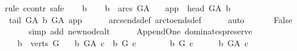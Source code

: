 \begin{isabellebody}
%
\isadelimproof
%
\endisadelimproof
%
\isatagproof
{}\isamarkupfalse%
{\isacharparenleft}{\kern0pt}rule\ ccontr{\isacharcomma}{\kern0pt}\ safe{\isacharparenright}{\kern0pt}\isanewline
\ \ \isamarkupfalse%
\ b\isanewline
\ \ \isamarkupfalse%
\ {\isachardoublequoteopen}b\ {\isasymin}\ arcs\ G{\isacharunderscore}{\kern0pt}A{\isachardoublequoteclose}\isanewline
\ \ \ {\isachardoublequoteopen}app\ {\isacharequal}{\kern0pt}\ head\ G{\isacharunderscore}{\kern0pt}A\ b{\isachardoublequoteclose}\isanewline
\ \ \isamarkupfalse%
\ \isamarkupfalse%
\ {\isachardoublequoteopen}tail\ G{\isacharunderscore}{\kern0pt}A\ b\ {\isasymrightarrow}\isactrlbsub G{\isacharunderscore}{\kern0pt}A\isactrlesub \ app{\isachardoublequoteclose}\isanewline
\ \ \ \ \isamarkupfalse%
\ arcs{\isacharunderscore}{\kern0pt}ends{\isacharunderscore}{\kern0pt}def\ arc{\isacharunderscore}{\kern0pt}to{\isacharunderscore}{\kern0pt}ends{\isacharunderscore}{\kern0pt}def\isanewline
\ \ \ \ \isamarkupfalse%
\ auto\ \isanewline
\ \ \isamarkupfalse%
\ \isamarkupfalse%
\ False\ \isanewline
\ \ \ \ \isamarkupfalse%
\ {\isacharparenleft}{\kern0pt}simp\ add{\isacharcolon}{\kern0pt}\ new{\isacharunderscore}{\kern0pt}node{\isacharunderscore}{\kern0pt}alt{\isacharparenright}{\kern0pt}\ \isanewline
{}\isamarkupfalse%
%
\endisatagproof
{\isafoldproof}%
%
\isadelimproof
\isanewline
%
\endisadelimproof
\ \ \isanewline
{}\isamarkupfalse%
\ {\isacharparenleft}{\kern0pt}\ Append{\isacharunderscore}{\kern0pt}One{\isacharparenright}{\kern0pt}\ dominates{\isacharunderscore}{\kern0pt}preserve{\isacharcolon}{\kern0pt}\isanewline
\ \ \ {\isachardoublequoteopen}b\ {\isasymin}\ verts\ G{\isachardoublequoteclose}\isanewline
\ \ \ {\isachardoublequoteopen}b\ {\isasymrightarrow}\isactrlbsub G{\isacharunderscore}{\kern0pt}A\isactrlesub \ c\ {\isasymlongleftrightarrow}\ b\ {\isasymrightarrow}\isactrlbsub G\isactrlesub \ c{\isachardoublequoteclose}\isanewline
%
\isadelimproof
%
\endisadelimproof
%
\isatagproof
{}\isamarkupfalse%
\ \ \isanewline
\ \ \isamarkupfalse%
\ {\isachardoublequoteopen}\ b\ {\isasymrightarrow}\isactrlbsub G\isactrlesub \ c{\isachardoublequoteclose}\isanewline
\ \ \isamarkupfalse%
\ \isamarkupfalse%
\ {\isachardoublequoteopen}b\ {\isasymrightarrow}\isactrlbsub G{\isacharunderscore}{\kern0pt}A\isactrlesub \ c{\isachardoublequoteclose}\isanewline

\end{isabellebody}
